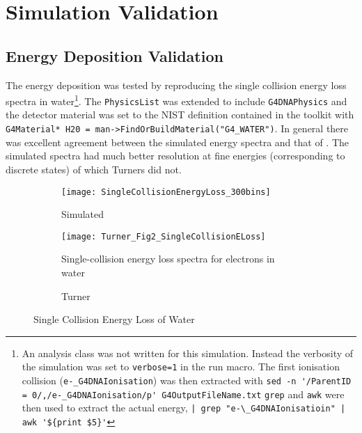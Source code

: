 \section{Simulation Validation}
\label{sec:SimValidation}

\subsection{Energy Deposition Validation}
The energy deposition was tested by reproducing the single collision energy loss spectra in water\footnote{%
An analysis class was not written for this simulation. 
Instead the verbosity of the simulation was set to \verb+verbose=1+ in the run macro.
The first ionisation collision (\verb+e-_G4DNAIonisation+) was then extracted with \verb+sed -n '/ParentID = 0/,/e-_G4DNAIonisation/p' G4OutputFileName.txt+ \verb+grep+ and \verb+awk+ were then used to extract the actual energy, \verb+| grep "e-\_G4DNAIonisatioin" | awk '${print $5}'+ %
}.
The \verb+PhysicsList+ was extended to include \verb+G4DNAPhysics+ and the detector material was set to the NIST definition contained in the toolkit with \verb+G4Material* H20 = man->FindOrBuildMaterial("G4_WATER")+.
In general there was excellent agreement between the simulated energy spectra and that of \cite{turner}.
The simulated spectra had much better resolution at fine energies (corresponding to discrete states) of which Turners did not.
\begin{figure}[h]
    \centering
    \begin{subfigure}[b]{0.45\figurewidth}
        \texttt{[image: SingleCollisionEnergyLoss\_300bins]}
        \caption{Simulated}
    \end{subfigure}
    \begin{subfigure}[b]{0.45\figurewidth}
        \texttt{[image: Turner\_Fig2\_SingleCollisionELoss]}
        \caption{Single-collision energy loss spectra for electrons in water \protect\cite{turner_comparative_1982}}
        \caption{Turner}
    \end{subfigure}
    \caption{Single Collision Energy Loss of Water}
\end{figure}
